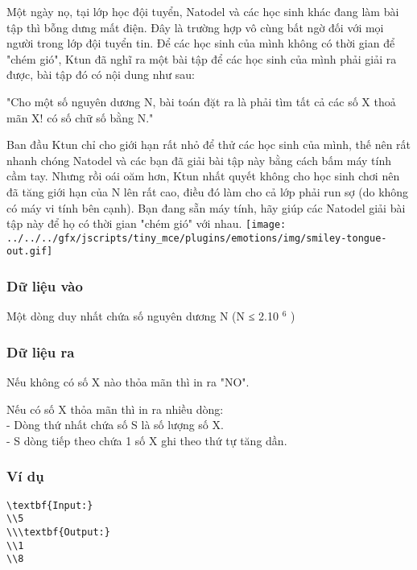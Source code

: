 



   Một ngày nọ, tại lớp học đội tuyển, Natodel và các học sinh khác đang làm bài tập thì bỗng dưng mất điện. Đây là trường hợp vô cùng bất ngờ đối với mọi người trong lớp đội tuyển tin. Để các học sinh của mình không có thời gian để "chém gió", Ktun đã nghĩ ra một bài tập để các học sinh của mình phải giải ra được, bài tập đó có nội dung như sau:  

   "Cho một số nguyên dương N, bài toán đặt ra là phải tìm tất cả các số X thoả mãn X! có số chữ số bằng N."  

   Ban đầu Ktun chỉ cho giới hạn rất nhỏ để thử các học sinh của mình, thế nên rất nhanh chóng Natodel và các bạn đã giải bài tập này bằng cách bấm máy tính cầm tay. Nhưng rồi oái oăm hơn, Ktun nhất quyết không cho học sinh chơi nên đã tăng giới hạn của N lên rất cao, điều đó làm cho cả lớp phải run sợ (do không có máy vi tính bên cạnh). Bạn đang sẵn máy tính, hãy giúp các Natodel giải bài tập này để họ có thời gian "chém gió" với nhau.   
\texttt{[image: ../../../gfx/jscripts/tiny\_mce/plugins/emotions/img/smiley-tongue-out.gif]}

\subsubsection{   Dữ liệu vào  }

   Một dòng duy nhất chứa số nguyên dương N (N ≤ 2.10   $^    6   $   )  

\subsubsection{   Dữ liệu ra  }

   Nếu không có số X nào thỏa mãn thì in ra "NO".  

   Nếu có số X thỏa mãn thì in ra nhiều dòng:   
\\   - Dòng thứ nhất chứa số S là số lượng số X.   
\\   - S dòng tiếp theo chứa 1 số X ghi theo thứ tự tăng dần.  

\subsubsection{   Ví dụ  }
\begin{verbatim}
\textbf{Input:}
\\5
\\\textbf{Output:}
\\1
\\8\end{verbatim}